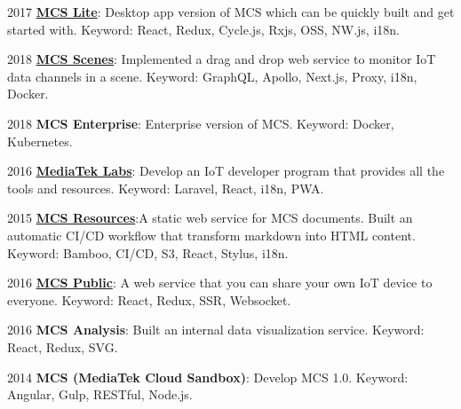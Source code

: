 \begin{cventries}
{\begin{cvitems}
        \item {2017 \href{https://mcslite.netlify.com/}{\textbf{MCS Lite}}: Desktop app version of MCS which can be quickly built and get started with. Keyword: React, Redux, Cycle.js, Rxjs, OSS, NW.js, i18n.}
        \item {2018 \href{https://medium.com/mediatekcloudsandbox/\%E5\%A6\%82\%E4\%BD\%95\%E9\%80\%8F\%E9\%81\%8E-scene-\%E5\%A0\%B4\%E6\%99\%AF-\%E5\%8A\%9F\%E8\%83\%BD\%E5\%BF\%AB\%E9\%80\%9F\%E6\%89\%93\%E9\%80\%A0\%E7\%89\%A9\%E8\%81\%AF\%E7\%B6\%B2\%E6\%87\%89\%E7\%94\%A8-1-d10d0d687742}{\textbf{MCS Scenes}}: Implemented a drag and drop web service to monitor IoT data channels in a scene. Keyword: GraphQL, Apollo, Next.js, Proxy, i18n, Docker.}
        \item {2018 \textbf{MCS Enterprise}: Enterprise version of MCS. Keyword: Docker, Kubernetes.}
        \item {2016 \href{https://labs.mediatek.com}{\textbf{MediaTek Labs}}: Develop an IoT developer program that provides all the tools and resources. Keyword: Laravel, React, i18n, PWA.}
        \item {2015 \href{https://mcs.mediatek.com/resources/latest/introduction}{\textbf{MCS Resources}}:A static web service for MCS documents. Built an automatic CI/CD workflow that transform markdown into HTML content. Keyword: Bamboo, CI/CD, S3, React, Stylus, i18n.}
        \item {2016 \href{https://medium.com/mediatekcloudsandbox/\%E5\%B0\%87\%E6\%82\%A8\%E7\%9A\%84\%E8\%A3\%9D\%E7\%BD\%AE\%E8\%A8\%AD\%E7\%82\%BA\%E5\%85\%AC\%E9\%96\%8B\%E4\%B8\%A6\%E5\%88\%86\%E4\%BA\%AB\%E7\%B5\%A6\%E4\%BB\%BB\%E4\%BD\%95\%E4\%BA\%BA\%E7\%80\%8F\%E8\%A6\%BD-a96d47ba5859}{\textbf{MCS Public}}: A web service that you can share your own IoT device to everyone. Keyword: React, Redux, SSR, Websocket.}
        \item {2016 \textbf{MCS Analysis}: Built an internal data visualization service. Keyword: React, Redux, SVG.}
        \item {2014 \textbf{MCS (MediaTek Cloud Sandbox)}: Develop MCS 1.0. Keyword: Angular, Gulp, RESTful, Node.js.}
      \end{cvitems}
    }



\end{cventries}
